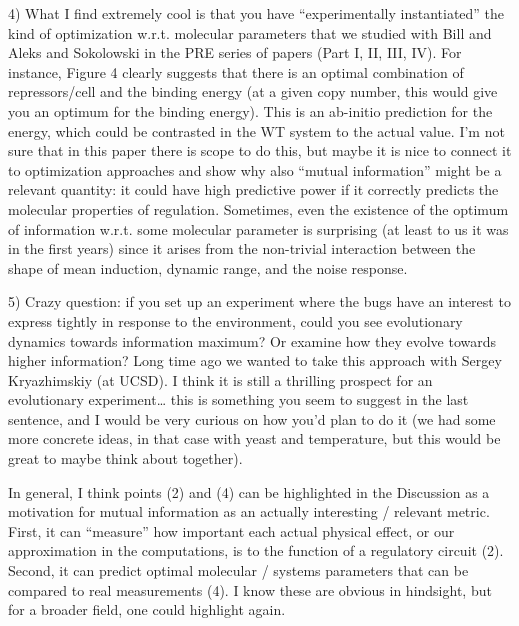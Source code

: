 \begin{tcolorbox}
4) What I find extremely cool is that you have “experimentally instantiated” the
kind of optimization w.r.t. molecular parameters that we studied with Bill and
Aleks and Sokolowski in the PRE series of papers (Part I, II, III, IV). For
instance, Figure 4 clearly suggests that there is an optimal combination of
repressors/cell and the binding energy (at a given copy number, this would give
you an optimum for the binding energy). This is an ab-initio prediction for the
energy, which could be contrasted in the WT system to the actual value. I’m not
sure that in this paper there is scope to do this, but maybe it is nice to
connect it to optimization approaches and show why also “mutual information”
might be a relevant quantity: it could have high predictive power if it
correctly predicts the molecular properties of regulation. Sometimes, even the
existence of the optimum of information w.r.t. some molecular parameter is
surprising (at least to us it was in the first years) since it arises from the
non-trivial interaction between the shape of mean induction, dynamic range, and
the noise response.
\end{tcolorbox}

\begin{tcolorbox}
5) Crazy question: if you set up an experiment where the bugs have an interest
to express tightly in response to the environment, could you see evolutionary
dynamics towards information maximum? Or examine how they evolve towards higher
information? Long time ago we wanted to take this approach with Sergey
Kryazhimskiy (at UCSD). I think it is still a thrilling prospect for an
evolutionary experiment… this is something you seem to suggest in the last
sentence, and I would be very curious on how you’d plan to do it (we had some
more concrete ideas, in that case with yeast and temperature, but this would be
great to maybe think about together).
\end{tcolorbox}

\begin{tcolorbox}
In general, I think points (2) and (4) can be highlighted in the Discussion as a
motivation for mutual information as an actually interesting / relevant metric.
First, it can “measure” how important each actual physical effect, or our
approximation in the computations, is to the function of a regulatory circuit
(2). Second, it can predict optimal molecular / systems parameters that can be
compared to real measurements (4). I know these are obvious in hindsight, but
for a broader field, one could highlight again.
\end{tcolorbox}
